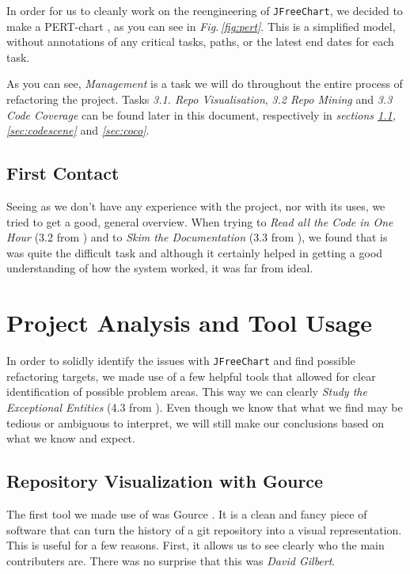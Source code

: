 \documentclass[11pt]{article}
\begin{document}
	In order for us to cleanly work on the reengineering of \texttt{JFreeChart}, we decided to make a \textsf{PERT}-chart \cite{pert}, as you can see in \textsl{Fig.\,\ref{fig:pert}}. This is a simplified model, without annotations of any critical tasks, paths, or the latest end dates for each task. 
   
	As you can see, \textsl{Management} is a task we will do throughout the entire process of refactoring the project. Tasks \textsl{3.1. Repo Visualisation}, \textsl{3.2 Repo Mining} and \textsl{3.3 Code Coverage} can be found later in this document, respectively in \textsl{sections \ref{sec:gource}, \ref{sec:codescene}} and \textsl{\ref{sec:coco}}. 
   
	
	\subsection{First Contact}
	Seeing as we don't have any experience with the project, nor with its uses, we tried to get a good, general overview. When trying to \textsl{Read all the Code in One Hour} (3.2 from \cite{demeyer2009object}) and to \textsl{Skim the Documentation} (3.3 from \cite{demeyer2009object}), we found that is was quite the difficult task and although it certainly helped in getting a good understanding of how the system worked, it was far from ideal.
	
	
	\section{Project Analysis and Tool Usage}
	In order to solidly identify the issues with \texttt{JFreeChart} and find possible refactoring targets, we made use of a few helpful tools that allowed for clear identification of possible problem areas. This way we can clearly \textsl{Study the Exceptional Entities} (4.3 from \cite{demeyer2009object}). Even though we know that what we find may be tedious or ambiguous to interpret, we will still make our conclusions based on what we know and expect.
	
	\subsection{Repository Visualization with Gource}
	\label{sec:gource}
	The first tool we made use of was \textsf{Gource} \cite{gource}. It is a clean and fancy piece of software that can turn the history of a git repository into a visual representation. This is useful for a few reasons. First, it allows us to see clearly who the main contributers are. There was no surprise that this was \textsl{David Gilbert}.
	
\end{document}
